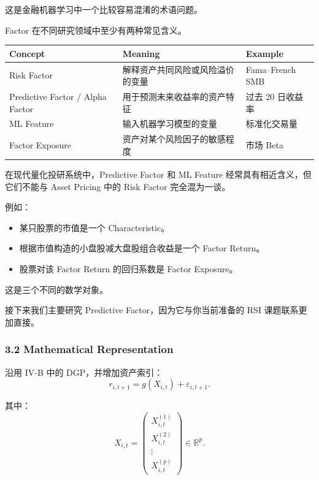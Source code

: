 这是金融机器学习中一个比较容易混淆的术语问题。

Factor 在不同研究领域中至少有两种常见含义。

\begin{readertable}
\begin{longtable}[]{@{}
  >{\raggedright\arraybackslash}p{}
  >{\raggedright\arraybackslash}p{}
  >{\raggedright\arraybackslash}p{}@{}}
\toprule
Concept & Meaning & Example \\
\midrule
\endhead
Risk Factor & 解释资产共同风险或风险溢价的变量 & Fama--French SMB \\
Predictive Factor / Alpha Factor & 用于预测未来收益率的资产特征 & 过去 20 日收益率 \\
ML Feature & 输入机器学习模型的变量 & 标准化交易量 \\
Factor Exposure & 资产对某个风险因子的敏感程度 & 市场 Beta \\
\bottomrule
\end{longtable}
\end{readertable}

在现代量化投研系统中，Predictive Factor 和 ML Feature 经常具有相近含义，但它们不能与 Asset Pricing 中的 Risk Factor 完全混为一谈。

例如：

\begin{itemize}
\tightlist
\item
  某只股票的市值是一个 Characteristic。
\item
  根据市值构造的小盘股减大盘股组合收益是一个 Factor Return。
\item
  股票对该 Factor Return 的回归系数是 Factor Exposure。
\end{itemize}

这是三个不同的数学对象。

接下来我们主要研究 Predictive Factor，因为它与你当前准备的 RSI 课题联系更加直接。

\hypertarget{part-4-63-0001-mathematical-representation}{%
\subsubsection{3.2 Mathematical Representation}\label{part-4-63-0001-mathematical-representation}}

沿用 IV-B 中的 DGP，并增加资产索引：
\[r_{i,t+1}
=
g(X_{i,t})+\varepsilon_{i,t+1}.\]

其中：
\[X_{i,t}
=
\begin{pmatrix}
X_{i,t}^{(1)}\\
X_{i,t}^{(2)}\\
\vdots\\
X_{i,t}^{(p)}
\end{pmatrix}
\in\mathbb R^p.\]

